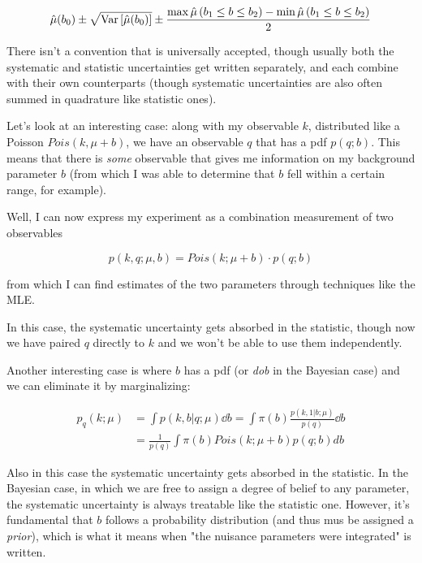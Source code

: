 	\[
	\hat\mu(b_0)\pm \sqrt{\operatorname{Var}\left[\hat\mu(b_0)\right]}\pm\frac{\max \hat\mu\left(b_1\leq b \leq b_2\right)-\min\hat\mu\left(b_1\leq b \leq b_2\right)}{2}
	\]

There isn't a convention that is universally accepted, though usually both the systematic and statistic uncertainties get written separately, and each combine with their own counterparts (though systematic uncertainties are also often summed in quadrature like statistic ones). 

\begin{example}
	Let's look at an interesting case: along with my observable $k$, distributed like a Poisson $Pois(k,\mu+b)$, we have an observable $q$ that has a pdf $p(q;b)$. This means that there is \emph{some} observable that gives me information on my background parameter $b$ (from which I was able to determine that $b$ fell within a certain range, for example). 
	
	Well, I can now express my experiment as a combination measurement of two observables
	
	\[
	p(k,q;\mu,b) = Pois(k;\mu+b)\cdot p(q;b)
	\]
	
	from which I can find estimates of the two parameters through techniques like the MLE. 
	
	In this case, the systematic uncertainty gets absorbed in the statistic, though now we have paired $q$ directly to $k$ and we won't be able to use them independently. 
\end{example}

\begin{example}
	Another interesting case is where $b$ has a pdf (or \emph{dob} in the Bayesian case) and we can eliminate it by marginalizing:
	
	\begin{align*}
	p_q(k;\mu) &= \int p(k,b|q;\mu)\dd b = \int \pi(b)\frac{p(k,1|b;\mu)}{p(q)}\dd b\\
	&= \frac{1}{p(q)}\int \pi(b) Pois(k;\mu+b)p(q;b)db
	\end{align*}
	
	Also in this case the systematic uncertainty gets absorbed in the statistic. In the Bayesian case, in which we are free to assign a degree of belief to any parameter, the systematic uncertainty is always treatable like the statistic one. However, it's fundamental that $b$ follows a probability distribution (and thus mus be assigned a \emph{prior}), which is what it means when "the nuisance parameters were integrated" is written.
\end{example}


